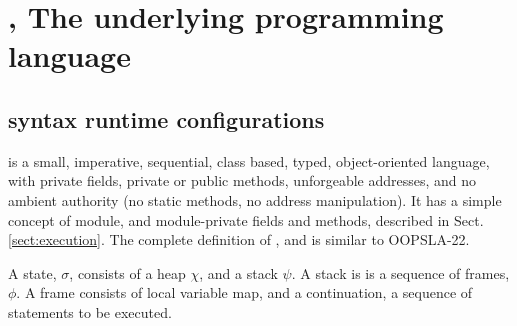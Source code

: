 \section{\LangOO, The underlying programming language }  

\subsection{\LangOO syntax runtime configurations}
\label{sub:Loo} 
 \LangOO  is a {small}, imperative, sequential,  class based, typed, object-oriented language,  
 with private fields, private or public methods, unforgeable addresses, and no ambient authority (no static methods, no address manipulation).
 It has a simple concept of module, and module-private fields and methods, described in Sect. \ref{sect:execution}.
 The complete definition of , and is  similar to   OOPSLA-22.

A \LangOO state, $\sigma$,  consists of a  heap $\chi$, and a   stack $\psi$. A stack is is a sequence of frames, $\phi$.
A frame consists of local variable map, and a continuation, \ie a sequence of statements to be executed.


 
